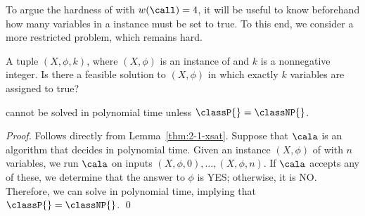 To argue the hardness of \GRC{} with $w(\call) = 4$, it will be useful to know beforehand how many variables in a \rXthreeSAT{} instance must be set to true.
To this end, we consider a more restricted problem, which remains hard.


{
A tuple $(X, \phi, k)$, where $(X, \phi)$ is an instance of \rXthreeSAT{} and $k$ is a nonnegative integer.
}
{
Is there a feasible solution to $(X, \phi)$ in which exactly $k$ variables are assigned to true?
}

\begin{lemma}
\label{thm:k-true-xsat}
    \kXthreeSAT{} cannot be solved in polynomial time unless $\classP{} = \classNP{}$.
\end{lemma}

\begin{proof}
    Follows directly from Lemma~\ref{thm:2-1-xsat}. Suppose that $\cala$ is an algorithm that decides \kXthreeSAT{} in polynomial time. Given an instance $(X, \phi)$ of \rXthreeSAT{} with $n$ variables, we run $\cala$ on inputs $(X, \phi, 0), \ldots, (X, \phi, n)$. If $\cala$ accepts any of these, we determine that the answer to $\phi$ is YES; otherwise, it is NO. Therefore, we can solve \rXthreeSAT{} in polynomial time, implying that $\classP{} = \classNP{}$.
    \qed
\end{proof}
\medskip


